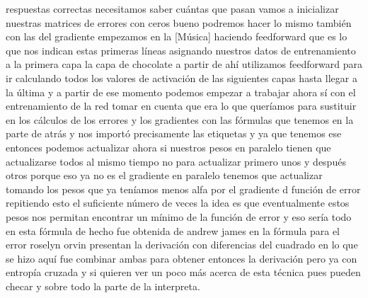 respuestas correctas necesitamos saber cuántas que pasan vamos a inicializar nuestras matrices de errores con ceros bueno podremos hacer lo mismo también con las del gradiente empezamos en la [Música] haciendo feedforward que es lo que nos indican estas primeras líneas asignando nuestros datos de entrenamiento a la primera capa la capa de chocolate a partir de ahí utilizamos feedforward para ir calculando todos los valores de activación de las siguientes capas hasta llegar a la última y a partir de ese momento podemos empezar a trabajar ahora sí con el entrenamiento de la red tomar en cuenta que era lo que queríamos para sustituir en los cálculos de los errores y los gradientes con las fórmulas que tenemos en la parte de atrás y nos importó precisamente las etiquetas y ya que tenemos ese entonces podemos actualizar ahora si nuestros pesos en paralelo tienen que actualizarse todos al mismo tiempo no para actualizar primero unos y después otros porque eso ya no es el gradiente en paralelo tenemos que actualizar tomando los pesos que ya teníamos menos alfa por el gradiente d función de error repitiendo esto el suficiente número de veces la idea es que eventualmente estos pesos nos permitan encontrar un mínimo de la función de error y eso sería todo en esta fórmula de hecho fue obtenida de andrew james en la fórmula para el error roselyn orvin presentan la derivación con diferencias del cuadrado en lo que se hizo aquí fue combinar ambas para obtener entonces la derivación pero ya con entropía cruzada y si quieren ver un poco más acerca de esta técnica pues pueden checar y sobre todo la parte de la interpreta.
